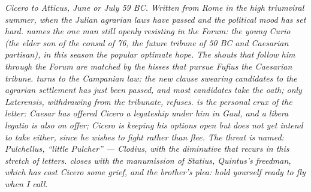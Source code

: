 
\textit{Cicero to Atticus, June or July 59 BC. Written from
Rome in the high triumviral summer, when the Julian
agrarian laws have passed and the political mood has set
hard.  names the one man still openly
resisting in the Forum: the young Curio (the elder son of
the consul of 76, the future tribune of 50 BC and Caesarian
partisan), in this season the popular optimate hope. The
shouts that follow him through the Forum are matched by the
hisses that pursue Fufius the Caesarian tribune.  turns to the Campanian law: the new clause swearing
candidates to the agrarian settlement has just been passed,
and most candidates take the oath; only Laterensis, withdrawing
from the tribunate, refuses.  is the personal
crux of the letter: Caesar has offered Cicero a legateship
under him in Gaul, and a \textit{libera legatio} is also on
offer; Cicero is keeping his options open but does not yet
intend to take either, since he wishes to fight rather than
flee. The threat is named: \textit{Pulchellus}, ``little
Pulcher'' --- Clodius, with the diminutive that recurs in
this stretch of letters.  closes with the
manumission of Statius, Quintus's freedman, which has cost
Cicero some grief, and the brother's plea: hold yourself
ready to fly when I call.}

